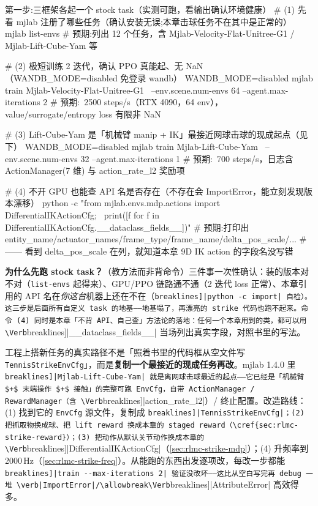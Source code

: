 \begin{codebox}[bash]{第一步:三框架各起一个 stock task（实测可跑，看输出确认环境健康）}
# (1) 先看 mjlab 注册了哪些任务（确认安装无误;本章击球任务不在其中是正常的）
mjlab list-envs
#   预期:列出 12 个任务，含 Mjlab-Velocity-Flat-Unitree-G1 / Mjlab-Lift-Cube-Yam 等

# (2) 极短训练 2 迭代，确认 PPO 真能起、无 NaN（WANDB_MODE=disabled 免登录 wandb）
WANDB_MODE=disabled mjlab train Mjlab-Velocity-Flat-Unitree-G1 \
    --env.scene.num-envs 64 --agent.max-iterations 2
#   预期:~2500 steps/s（RTX 4090，64 env），value/surrogate/entropy loss 有限非 NaN

# (3) Lift-Cube-Yam 是「机械臂 manip + IK」最接近网球击球的现成起点（见下）
WANDB_MODE=disabled mjlab train Mjlab-Lift-Cube-Yam \
    --env.scene.num-envs 32 --agent.max-iterations 1
#   预期:~700 steps/s，日志含 ActionManager(7 维) 与 action_rate_l2 奖励项

# (4) 不开 GPU 也能查 API 名是否存在（不存在会 ImportError，能立刻发现版本漂移）
python -c "from mjlab.envs.mdp.actions import DifferentialIKActionCfg; \
print([f for f in DifferentialIKActionCfg.__dataclass_fields__])"
#   预期:打印出 entity_name/actuator_names/frame_type/frame_name/delta_pos_scale/...
#         —— 看到 delta_pos_scale 在列，就知道本章 9D IK action 的字段名没写错
\end{codebox}

\noindent{}\textbf{为什么先跑 stock task？}（教方法而非背命令）三件事一次性确认：装的版本对不对（\verb|list-envs| 起得来）、GPU/PPO 链路通不通（2 迭代 loss 正常）、本章引用的 API 名在\emph{你这台}机器上还在不在（\Verb[breaklines]|python -c import| 自检）。这三步是后面所有自定义 task 的地基——地基塌了，再漂亮的 strike 代码也跑不起来。命令 (4) 同时是本章「不背 API、自己查」方法论的落地：任何一个本章用到的类，都可以用 \Verb[breaklines]|__dataclass_fields__| 当场列出真实字段，对照书里的写法。

\begin{insight}\label{ins:rlmc-strike-retrofit}
工程上搭新任务的真实路径不是「照着书里的代码框从空文件写 \texttt{TennisStrikeEnvCfg}」，而是\textbf{复制一个最接近的现成任务再改}。mjlab 1.4.0 里 \Verb[breaklines]|Mjlab-Lift-Cube-Yam| 就是离网球击球最近的起点——它已经是「机械臂 $+$ 末端操作 $+$ 接触」的完整可跑 EnvCfg，自带 ActionManager / RewardManager（含 \Verb[breaklines]|action_rate_l2|）/ 终止配置。改造路线：(1) 找到它的 \verb|EnvCfg| 源文件，复制成 \Verb[breaklines]|TennisStrikeEnvCfg|；(2) 把抓取物换成球、把 lift reward 换成本章的 staged reward（\cref{sec:rlmc-strike-reward}）；(3) 把动作从默认关节动作换成本章的 \Verb[breaklines]|DifferentialIKActionCfg|（\cref{sec:rlmc-strike-mdp}）；(4) 升频率到 2000\,Hz（\cref{sec:rlmc-strike-freq}）。从能跑的东西出发逐项改，每改一步都能 \Verb[breaklines]|train --max-iterations 2| 验证没改坏——这比从空白写完再 debug 一堆 \verb|ImportError|/\allowbreak\Verb[breaklines]|AttributeError| 高效得多。
\end{insight}

